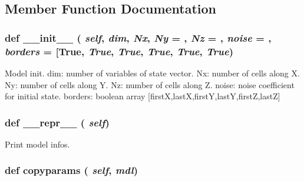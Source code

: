 \subsection{Member Function Documentation}
\hypertarget{classcell__mdl_1_1_tissue_model_ac775ee34451fdfa742b318538164070e}{
\subsubsection[{\_\-\_\-init\_\-\_\-}]{\setlength{\rightskip}{0pt plus 5cm}def \_\-\_\-init\_\-\_\- ( {\em self}, \/   {\em dim}, \/   {\em Nx}, \/   {\em Ny} = {}, \/   {\em Nz} = {}, \/   {\em noise} = {}, \/   {\em borders} = {\ttfamily \mbox{[}True}, \/   {\em True}, \/   {\em True}, \/   {\em True}, \/   {\em True}, \/   {\em True})}}
\label{classcell__mdl_1_1_tissue_model_ac775ee34451fdfa742b318538164070e}
\begin{DoxyVerb}Model init.
    dim: number of variables of state vector.
    Nx: number of cells along X.
    Ny: number of cells along Y.
    Nz: number of cells along Z.
    noise: noise coefficient for initial state.
    borders: boolean array [firstX,lastX,firstY,lastY,firstZ,lastZ]\end{DoxyVerb}
 \hypertarget{classcell__mdl_1_1_tissue_model_ad8b9328939df072e4740cd9a63189744}{
\subsubsection[{\_\-\_\-repr\_\-\_\-}]{\setlength{\rightskip}{0pt plus 5cm}def \_\-\_\-repr\_\-\_\- ( {\em self})}}
\label{classcell__mdl_1_1_tissue_model_ad8b9328939df072e4740cd9a63189744}
\begin{DoxyVerb}Print model infos.\end{DoxyVerb}
 \hypertarget{classcell__mdl_1_1_tissue_model_a18cbf53eb92c048eacd39a7844d1ec80}{
\subsubsection[{copyparams}]{\setlength{\rightskip}{0pt plus 5cm}def copyparams ( {\em self}, \/   {\em mdl})}}
